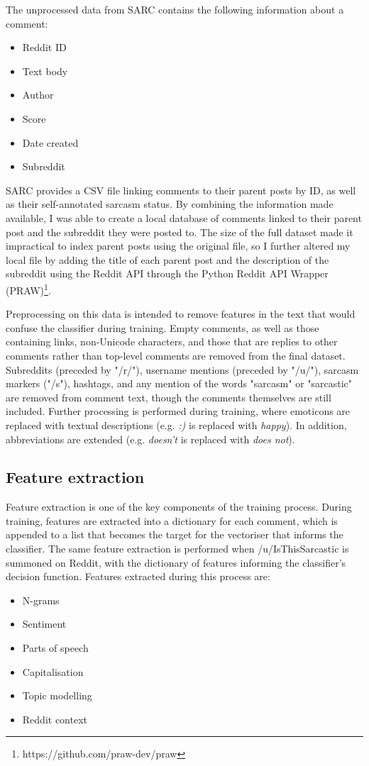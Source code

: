 \documentclass[a4paper,12pt]{article}
\begin{document}
The unprocessed data from SARC contains the following information about a comment:
\begin{itemize}
  \item Reddit ID
  \item Text body
  \item Author
  \item Score
  \item Date created
  \item Subreddit
\end{itemize}
SARC provides a CSV file linking comments to their parent posts by ID, as well as their self-annotated sarcasm status. By combining the information made available, I was able to create a local database of comments linked to their parent post and the subreddit they were posted to. The size of the full dataset made it impractical to index parent posts using the original file, so I further altered my local file by adding the title of each parent post and the description of the subreddit using the Reddit API through the Python Reddit API Wrapper (PRAW)\footnote{https://github.com/praw-dev/praw}.

Preprocessing on this data is intended to remove features in the text that would confuse the classifier during training. Empty comments, as well as those containing links, non-Unicode characters, and those that are replies to other comments rather than top-level comments are removed from the final dataset. Subreddits (preceded by "/r/"), username mentions (preceded by "/u/"), sarcasm markers ("/s"), hashtags, and any mention of the words "sarcasm" or "sarcastic" are removed from comment text, though the comments themselves are still included. Further processing is performed during training, where emoticons are replaced with textual descriptions (e.g. \textit{:)} is replaced with \textit{happy}). In addition, abbreviations are extended (e.g. \textit{doesn't} is replaced with \textit{does not}).

\subsection{Feature extraction}
Feature extraction is one of the key components of the training process. During training, features are extracted into a dictionary for each comment, which is appended to a list that becomes the target for the vectoriser that informs the classifier. The same feature extraction is performed when /u/IsThisSarcastic is summoned on Reddit, with the dictionary of features informing the classifier's decision function.
Features extracted during this process are:
\begin{itemize}
  \item N-grams
  \item Sentiment
  \item Parts of speech
  \item Capitalisation
  \item Topic modelling
  \item Reddit context
\end{itemize}
\end{document}
